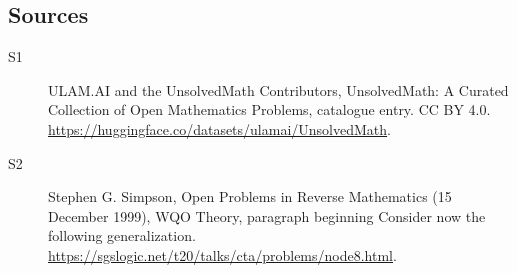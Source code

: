 \documentclass[11pt]{article}
\begin{document}
\subsection{Sources}
\begin{description}
\item[\hypertarget{source:statement:1}{S1}] ULAM.AI and the UnsolvedMath Contributors, UnsolvedMath: A Curated Collection of Open Mathematics Problems, catalogue entry. CC BY 4.0. \url{https://huggingface.co/datasets/ulamai/UnsolvedMath}.
\item[\hypertarget{source:statement:2}{S2}] Stephen G. Simpson, Open Problems in Reverse Mathematics (15 December 1999), WQO Theory, paragraph beginning Consider now the following generalization. \url{https://sgslogic.net/t20/talks/cta/problems/node8.html}.
\end{description}
\label{end:statement}
\end{document}
